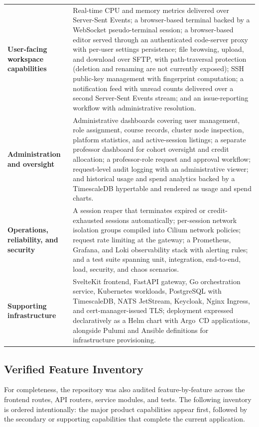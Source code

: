 \documentclass[12pt,a4paper]{article}
\begin{document}
\begin{longtable}{
    >{\raggedright\arraybackslash\bfseries}p{}
    >{\raggedright\arraybackslash}p{}
}
User-facing workspace capabilities &
Real-time CPU and memory metrics delivered over Server-Sent Events; a
browser-based terminal backed by a WebSocket pseudo-terminal session; a
browser-based editor served through an authenticated code-server proxy with
per-user settings persistence; file browsing, upload, and download over SFTP,
with path-traversal protection (deletion and renaming are not currently exposed);
SSH public-key management with fingerprint computation; a notification feed with
unread counts delivered over a second Server-Sent Events stream; and an
issue-reporting workflow with administrative resolution. \\

Administration and oversight &
Administrative dashboards covering user management, role assignment, course
records, cluster node inspection, platform statistics, and active-session
listings; a separate professor dashboard for cohort oversight and credit
allocation; a professor-role request and approval workflow; request-level audit
logging with an administrative viewer; and historical usage and spend analytics
backed by a TimescaleDB hypertable and rendered as usage and spend charts. \\

Operations, reliability, and security &
A session reaper that terminates expired or credit-exhausted sessions
automatically; per-session network isolation groups compiled into Cilium network
policies; request rate limiting at the gateway; a Prometheus, Grafana, and Loki
observability stack with alerting rules; and a test suite spanning unit,
integration, end-to-end, load, security, and chaos scenarios. \\

Supporting infrastructure &
SvelteKit frontend, FastAPI gateway, Go orchestration service, Kubernetes
workloads, PostgreSQL with TimescaleDB, NATS JetStream, Keycloak, Nginx Ingress,
and cert-manager-issued TLS; deployment expressed declaratively as a Helm chart
with Argo~CD applications, alongside Pulumi and Ansible definitions for
infrastructure provisioning. \\

\end{longtable}
\normalsize

\subsection{Verified Feature Inventory}
For completeness, the repository was also audited feature-by-feature across the
frontend routes, API routers, service modules, and tests. The following
inventory is ordered intentionally: the major product capabilities appear first,
followed by the secondary or supporting capabilities that complete the current
application.
\end{document}
